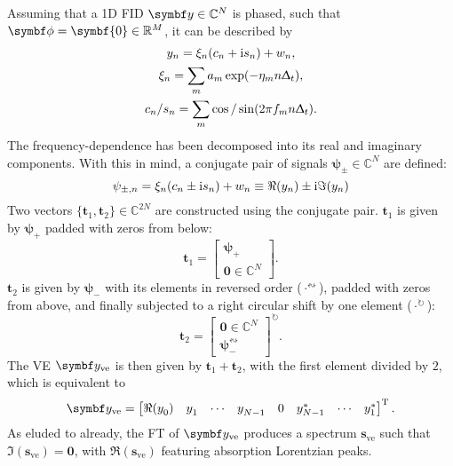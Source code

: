 Assuming that a \ac{1D} \ac{FID} $\by \in \mathbb{C}^N$ is phased, such that
$\bdphi = \symbf{0} \in \mathbb{R}^M$, it can be described by
\begin{subequations}
    \begin{gather}
        y_n = \xi_n (c_n + \mathrm{i} s_n) + w_n,\\
        \xi_n = \sum_m a_m \exp(-\eta_m n \Updelta_t),\\
        c_n / s_n = \sum_m \cos / \sin(2 \pi f_m n \Updelta_t).
    \end{gather}
\end{subequations}
The frequency-dependence has been decomposed into its real and imaginary
components. With this in mind, a conjugate pair of signals $\symbf{\psi}_{\pm}
\in \mathbb{C}^N$ are defined:
\begin{equation}
    \psi_{\pm,n} = \xi_n (c_n \pm \mathrm{i} s_n) + w_n \equiv \Re(y_n) \pm \mathrm{i} \Im(y_n)
\end{equation}
Two vectors $\lbrace \symbf{t}_{1}, \symbf{t}_2 \rbrace \in \mathbb{C}^{2N}$
are constructed using the conjugate pair.
$\symbf{t}_1$ is given by $\symbf{\psi}_+$ padded with zeros from below:
    \begin{equation}
        \symbf{t}_1 = \begin{bmatrix}
            \symbf{\psi}_+ \\ \symbf{0} \in \mathbb{C}^{N}
        \end{bmatrix}.
    \end{equation}
$\symbf{t}_2$ is given by $\symbf{\psi}_{-}$ with its elements in
    reversed order ($\cdot^{{\leftrightsquigarrow}}$), padded with zeros
    from above, and finally subjected to a right circular shift by one
    element ($\cdot^{{\circlearrowright}}$):
    \begin{equation}
        \symbf{t}_2 = \begin{bmatrix}
            \symbf{0} \in \mathbb{C}^{N} \\ \symbf{\psi}_-^{{\leftrightsquigarrow}}
    \end{bmatrix}^{{\circlearrowright}}.
   \end{equation}
The \ac{VE} $\by_{\text{ve}}$ is then given by $\symbf{t}_1 +
\symbf{t}_2$, with the first element divided by $2$, which is equivalent to
\begin{equation}
    \by_{\text{ve}} =
    \begin{bmatrix}
        \Re(y_0^{\vphantom{*}}) &
        y_1^{\vphantom{*}} &
        \cdots &
        y_{N-1}^{\vphantom{*}} &
        0 &
        y_{N-1}^* &
        \cdots &
        y_1^*
    \end{bmatrix}\T.
\end{equation}
As eluded to already, the \ac{FT} of $\by_{\text{ve}}$ produces a spectrum
$\symbf{s}_{\text{ve}}$ such that $\Im\left(\symbf{s}_{\text{ve}}\right) =
\symbf{0}$, with $\Re\left(\symbf{s}_{\text{ve}}\right)$ featuring absorption
Lorentzian peaks.


